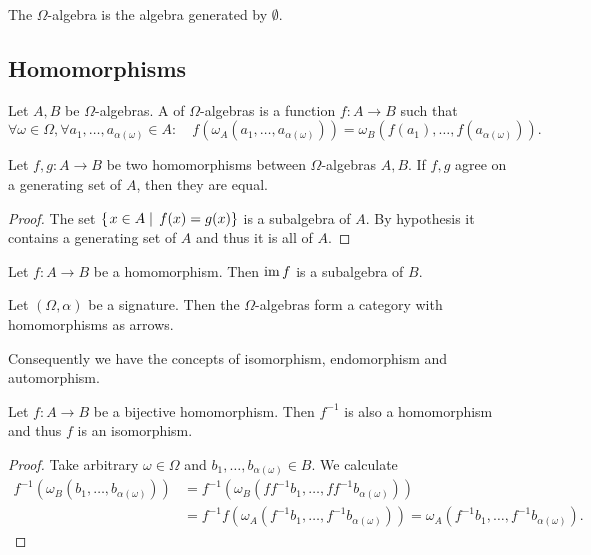 \begin{definition}
The  $\Omega$-algebra is the algebra generated by $\emptyset$.
\end{definition}

\subsection{Homomorphisms}
\begin{definition}
Let $A,B$ be $\Omega$-algebras. A  of $\Omega$-algebras is a function $f:A\to B$ such that
\[ \forall \omega\in\Omega, \forall a_1,\ldots,a_{\alpha(\omega)}\in A: \quad f(\omega_A(a_1,\ldots, a_{\alpha(\omega)})) = \omega_B(f(a_1), \ldots, f(a_{\alpha(\omega)})). \]
\end{definition}

\begin{proposition}
Let $f,g:A\to B$ be two homomorphisms between $\Omega$-algebras $A,B$. If $f,g$ agree on a generating set of $A$, then they are equal.
\end{proposition}
\begin{proof}
The set $\left\{\left. x\in A \;\right|\; f(x) = g(x) \right\}$ is a subalgebra of $A$. By hypothesis it contains a generating set of $A$ and thus it is all of $A$.
\end{proof}

\begin{proposition}
Let $f:A\to B$ be a homomorphism. Then $\operatorname{im} f$ is a subalgebra of $B$.
\end{proposition}

\begin{proposition}
Let $(\Omega,\alpha)$ be a signature. Then the $\Omega$-algebras form a category with homomorphisms as arrows.
\end{proposition}
Consequently we have the concepts of isomorphism, endomorphism and automorphism.

\begin{proposition} \label{bijectiveHomomorphism}
Let $f:A\to B$ be a bijective homomorphism. Then $f^{-1}$ is also a homomorphism and thus $f$ is an isomorphism.
\end{proposition}
\begin{proof}
Take arbitrary $\omega\in\Omega$ and $b_1,\ldots, b_{\alpha(\omega)}\in B$. We calculate
\begin{align*}
f^{-1}(\omega_B(b_1,\ldots, b_{\alpha(\omega)})) &= f^{-1}(\omega_B(ff^{-1}b_1,\ldots, ff^{-1}b_{\alpha(\omega)})) \\
&= f^{-1}f(\omega_A(f^{-1}b_1,\ldots, f^{-1}b_{\alpha(\omega)})) = \omega_A(f^{-1}b_1,\ldots, f^{-1}b_{\alpha(\omega)}).
\end{align*}
\end{proof}

